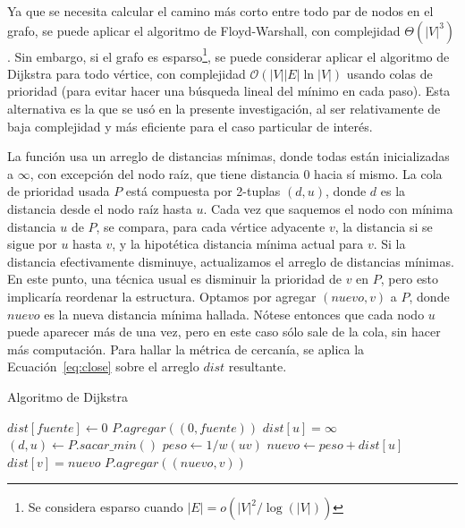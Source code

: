\documentclass[journal]{IEEEtran}
\let\MYoriglatexcaption\caption
\renewcommand{\caption}[2][\relax]{\MYoriglatexcaption[#2]{#2}}
\begin{document}
Ya que se necesita calcular el camino más corto entre todo par de nodos en el grafo, se puede aplicar el algoritmo de Floyd-Warshall, con complejidad \(\Theta(|V|^3)\) \cite{clrs}. Sin embargo, si el grafo es esparso\footnote{Se considera esparso cuando \(|E| = o(|V|^2 / \log(|V|))\)\cite{clrs}}, se puede considerar aplicar el algoritmo de Dijkstra para todo vértice, con complejidad \(\mathcal{O}(|V||E|\ln |V|)\) usando colas de prioridad (para evitar hacer una búsqueda lineal del mínimo en cada paso). Esta alternativa es la que se usó en la presente investigación, al ser relativamente de baja complejidad y más eficiente para el caso particular de interés.

La función  usa un arreglo de distancias mínimas, donde todas están inicializadas a \(\infty\), con excepción del nodo raíz, que tiene distancia \(0\) hacia sí mismo. La cola de prioridad usada \(P\) está compuesta por 2-tuplas \((d, u)\), donde \(d\) es la distancia desde el nodo raíz hasta \(u\). Cada vez que saquemos el nodo con mínima distancia \(u\) de \(P\), se compara, para cada vértice adyacente \(v\), la distancia si se sigue por \(u\) hasta \(v\), y la hipotética distancia mínima actual para \(v\). Si la distancia efectivamente disminuye, actualizamos el arreglo de distancias mínimas. En este punto, una técnica usual es disminuir la prioridad de \(v\) en \(P\)\cite{heap}, pero esto implicaría reordenar la estructura. Optamos por agregar \((nuevo, v)\) a \(P\), donde \(nuevo\) es la nueva distancia mínima hallada. Nótese entonces que cada nodo \(u\) puede aparecer más de una vez, pero en este caso sólo sale de la cola, sin hacer más computación. Para hallar la métrica de cercanía, se aplica la Ecuación~\ref{eq:close} sobre el arreglo \(dist\) resultante.
\begin{algorithm}[t]
	\caption{Algoritmo de Dijkstra} \label{alg:dijkstra}
\begin{algorithmic}
		\State $dist[fuente] \gets 0$
		\State $P.agregar((0, fuente))$
			\State $dist[u] = \infty$
		\EndFor
			\State $(d, u) \gets P.sacar\_min()$
					\State $peso \gets 1/w(uv)$
					\State $nuevo \gets peso + dist[u]$
						\State $dist[v] = nuevo$
						\State $P.agregar((nuevo, v))$
					\EndIf
				\EndFor
			\EndIf
		\EndWhile
	\EndFunction
\end{algorithmic}
\end{algorithm}
\end{document}
